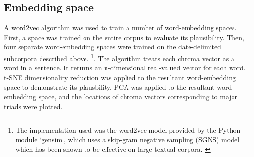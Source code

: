 \subsection{Embedding space}\label{embedding-space}

A word2vec algorithm was used to train a number of word-embedding
spaces. First, a space was trained on the entire corpus to evaluate its plausibility. Then, four separate word-embedding spaces were trained on the date-delimited subcorpora described above. \footnote{The implementation used was the word2vec model provided by the Python module `gensim`, which uses a skip-gram negative sampling (SGNS) model which has been shown to be effective on large textual corpora. \cite{rehurek_lrec}}.
The algorithm treats each chroma vector as a word in a sentence. It
returns an n-dimensional real-valued vector for each word. t-SNE
dimensionality reduction was applied to the resultant word-embedding
space to demonstrate its plausbility. PCA was applied to the resultant
word-embedding space, and the locations of chroma vectors corresponding
to major triads were plotted.
